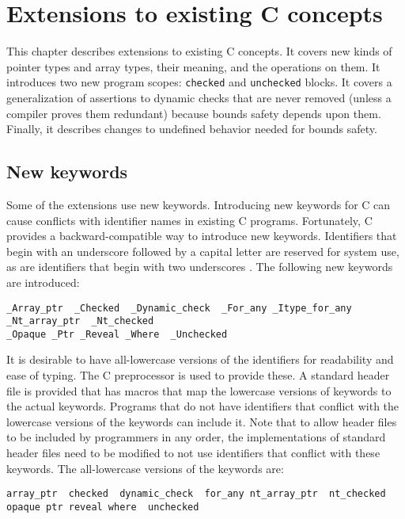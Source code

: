 
\chapter{Extensions to existing C concepts}
\label{chapter:core-extensions}

This chapter describes extensions to existing C concepts. 
It covers new kinds of pointer types and array types, their meaning,
and the operations  on them.   It introduces two
new program scopes: \lstinline+checked+ and \lstinline+unchecked+
blocks. It covers a generalization of assertions to 
dynamic checks that are never  removed (unless a compiler
proves them redundant) because bounds safety depends upon them. 
Finally, it describes changes to
undefined behavior needed for bounds safety.

\section{New keywords}
Some of the extensions use new keywords.   Introducing new keywords
for C can cause conflicts with identifier names in existing C programs.
Fortunately, C provides a backward-compatible way to introduce new
keywords.  Identifiers that begin with an underscore followed by a
capital letter are reserved for system use, as are identifiers that
begin with two underscores \cite[Section 7.1.3]{ISO2011}. The following
new keywords are introduced:
\begin{lstlisting}
_Array_ptr  _Checked  _Dynamic_check  _For_any _Itype_for_any _Nt_array_ptr  _Nt_checked 
_Opaque _Ptr _Reveal _Where  _Unchecked
\end{lstlisting}

It is desirable to have all-lowercase versions of the
identifiers for readability and ease of typing. The C
preprocessor is used to provide these. A standard header
file  is provided that has macros
that map the lowercase versions of keywords to the actual keywords.
Programs that do not have identifiers that conflict with the
lowercase versions of the keywords can include it.
Note that to allow header files to be included by programmers in any order,
the implementations of standard header files need to be modified to
not use identifiers that conflict with these keywords.
The all-lowercase versions of the keywords are:
\begin{lstlisting}
array_ptr  checked  dynamic_check  for_any nt_array_ptr  nt_checked 
opaque ptr reveal where  unchecked
\end{lstlisting}


